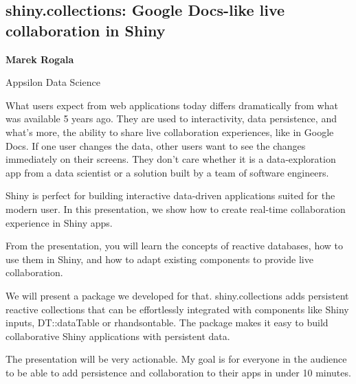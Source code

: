 \documentclass[\main/boa.tex]{subfiles}
\begin{document}
\subsection{shiny.collections: Google Docs-like live collaboration in Shiny}

\begin{minipage}{0.915\textwidth}
	\centering
  {\bf {} Marek Rogala}
\end{minipage}


\begin{affiliations}
\begin{minipage}{0.915\textwidth}
\centering
Appsilon Data Science \\[-2pt]
\end{minipage}
\end{affiliations}

\vskip 0.3cm

 What users expect from web applications today differs dramatically from what was available 5 years ago. They are used to interactivity, data persistence, and what’s more, the ability to share live collaboration experiences, like in Google Docs. If one user changes the data, other users want to see the changes immediately on their screens. They don’t care whether it is a data-exploration app from a data scientist or a solution built by a team of software engineers.
 
 Shiny is perfect for building interactive data-driven applications suited for the modern user. In this presentation, we show how to create real-time collaboration experience in Shiny apps.
 
 From the presentation, you will learn the concepts of reactive databases, how to use them in Shiny, and how to adapt existing components to provide live collaboration.
 
 We will present a package we developed for that. shiny.collections adds persistent reactive collections that can be effortlessly integrated with components like Shiny inputs, DT::dataTable or rhandsontable. The package makes it easy to build collaborative Shiny applications with persistent data.
 
 The presentation will be very actionable. My goal is for everyone in the audience to be able to add persistence and collaboration to their apps in under 10 minutes.
\end{document}
